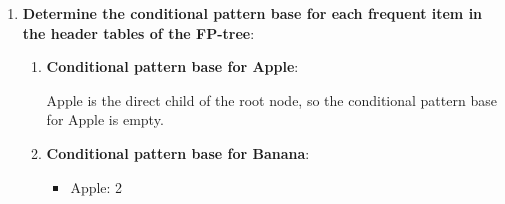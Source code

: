 \documentclass[
english,
smallborders
]{i6prcsht}
\begin{document}
\begin{solution}
\begin{enumerate}
\begin{enumerate}
\begin{center}
{
				            }
			            \end{center}
			            
		      \end{enumerate}
		      
		\item \textbf{Determine the conditional pattern base for each frequent item in the header tables of the FP-tree}:
		      
		      
		      \begin{enumerate}
			      \item \textbf{Conditional pattern base for Apple}:
			            
			            Apple is the direct child of the root node, so the conditional pattern base for Apple is empty.
			            
			      \item \textbf{Conditional pattern base for Banana}:
			            
			            \begin{itemize}
				            \item Apple: 2
			            \end{itemize}
			            

\end{enumerate}
\end{enumerate}
\end{solution}
\end{document}
